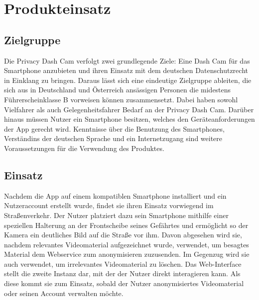\chapter{Produkteinsatz}

\section{Zielgruppe}
Die Privacy Dash Cam verfolgt zwei grundlegende Ziele: Eine Dash Cam für das Smartphone anzubieten und ihren Einsatz mit dem deutschen Datenschutzrecht in Einklang zu bringen. Daraus lässt sich eine eindeutige Zielgruppe ableiten, die sich aus in Deutschland und Österreich ansässigen Personen die midestens  Führerscheinklasse B vorweisen können zusammensetzt. Dabei haben sowohl Vielfahrer als auch Gelegenheitsfahrer Bedarf an der Privacy Dash Cam. Darüber hinaus müssen Nutzer ein Smartphone besitzen, welches den Geräteanforderungen der App gerecht wird. Kenntnisse über die Benutzung des Smartphones, Verständins der deutschen Sprache und ein Internetzugang sind weitere Voraussetzungen für die Verwendung des Produktes.

\section{Einsatz}
Nachdem die App auf einem kompatiblen Smartphone installiert und ein Nutzeraccount erstellt wurde, findet sie ihren Einsatz vorwiegend im Straßenverkehr. Der Nutzer platziert dazu sein Smartphone mithilfe einer speziellen Halterung an der Frontscheibe seines Gefährtes und ermöglicht so der Kamera ein deutliches Bild  auf die Straße vor ihm. Davon abgesehen wird sie, nachdem relevantes Videomaterial aufgezeichnet wurde, verwendet, um besagtes Material dem Webservice zum anonymisieren zuzusenden. Im Gegenzug wird sie auch verwendet, um irrelevantes Videomaterial zu löschen.\newline
Das Web-Interface stellt die zweite Instanz dar, mit der der Nutzer direkt interagieren kann. Als diese kommt sie zum Einsatz, sobald der Nutzer anonymisiertes Videomaterial oder seinen Account verwalten möchte.

